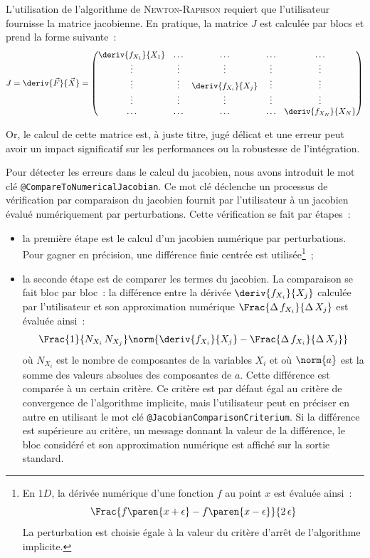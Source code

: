 \documentclass[12pt]{article}
\begin{document}
L'utilisation de l'algorithme de \textsc{Newton-Raphson} requiert que
l'utilisateur fournisse la matrice jacobienne. En pratique, la matrice
\(J\) est calculée par blocs et prend la forme suivante~:
\[
J = \deriv{\vec{F}}{\vec{X}} =
\begin{pmatrix}
  \deriv{f_{X_{1}}}{X_{1}} & \ldots & \ldots & \ldots & \ldots \\
  \vdots & \vdots & \vdots                   & \vdots & \vdots \\
  \vdots & \vdots & \deriv{f_{X_{i}}}{X_{j}} & \vdots & \vdots \\
  \vdots & \vdots & \vdots                   & \vdots & \vdots \\
  \ldots & \ldots & \ldots & \ldots & \deriv{f_{X_{N}}}{X_{N}} \\
\end{pmatrix}
\]

Or, le calcul de cette matrice est, à juste titre, jugé délicat et une
erreur peut avoir un impact significatif sur les performances ou la
robustesse de l'intégration.

Pour détecter les erreurs dans le calcul du jacobien, nous avons
introduit le mot clé \texttt{@Compare\-To\-Numerical\-Jacobian}. Ce
mot clé déclenche un processus de vérification par comparaison du
jacobien fournit par l'utilisateur à un jacobien évalué numériquement
par perturbations. Cette vérification se fait par étapes~:
\begin{itemize}
  \item la première étape est le calcul d'un jacobien numérique par
  perturbations. Pour gagner en précision, une différence finie centrée
  est utilisée\footnote{En \(1D\), la dérivée numérique d'une fonction
    \(f\) au point \(x\) est évaluée ainsi~:
    \[
    \Frac{f\paren{x+\epsilon}-f\paren{x-\epsilon}}{2\,\epsilon}
    \]
    La perturbation est choisie égale à la valeur du critère d'arrêt de
    l'algorithme implicite.
  }~;
  \item la seconde étape est de comparer les termes du jacobien. La
  comparaison se fait bloc par bloc~: la différence entre la dérivée
  \(\deriv{f_{X_{i}}}{X_{j}}\) calculée par l'utilisateur et son
  approximation numérique \(\Frac{\Delta\,f_{X_{i}}}{\Delta\,X_{j}}\)
  est évaluée ainsi~:
  \[
  \Frac{1}{N_{X_{i}}\,N_{X_{j}}}\norm{\deriv{f_{X_{i}}}{X_{j}}-\Frac{\Delta\,f_{X_{i}}}{\Delta\,X_{j}}}
  \]
  où \(N_{X_{i}}\) est le nombre de composantes de la variables
  \(X_{i}\) et où \(\norm{a}\) est la somme des valeurs absolues des
  composantes de \(a\). Cette différence est comparée à un certain
  critère. Ce critère est par défaut égal au critère de convergence de
  l'algorithme implicite, mais l'utilisateur peut en préciser en autre en
  utilisant le mot clé {\tt @Jacobian\-Comparison\-Criterium}. Si la
  différence est supérieure au critère, un message donnant la valeur de la
  différence, le bloc considéré et son approximation numérique est affiché
  sur la sortie standard.
\end{itemize}
\end{document}
